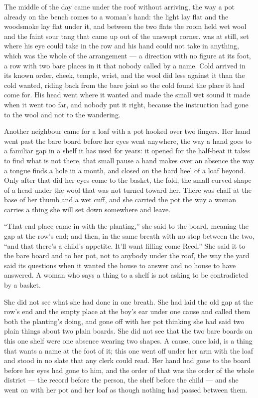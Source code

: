 The middle of the day came under the  roof without arriving, the way a pot already on the bench comes to a woman's hand: the light lay flat and the woodsmoke lay flat under it, and between the two flats the room held wet wool and the faint sour tang that came up out of the unswept  corner.  was at  still, set where his eye could take in the row and his hand could not take in anything, which was the whole of the arrangement --- a direction with no figure at its foot, a row with two bare places in it that nobody called by a name. Cold arrived in its known order, cheek, temple, wrist, and the wool did less against it than the cold wanted, riding back from the bare joint so the cold found the place it had come for. His head went where it wanted and made the small wet sound it made when it went too far, and nobody put it right, because the instruction had gone to the wool and not to the wandering.

Another neighbour came for a loaf with a pot hooked over two fingers. Her hand went past the bare board before her eyes went anywhere, the way a hand goes to a familiar gap in a shelf it has used for years: it opened for the half-beat it takes to find what is not there, that small pause a hand makes over an absence the way a tongue finds a hole in a mouth, and closed on the hard heel of a loaf beyond. Only after that did her eyes come to the basket, the fold, the small curved shape of a head under the wool that was not turned toward her. There was chaff at the base of her thumb and a wet cuff, and she carried the pot the way a woman carries a thing she will set down somewhere and leave.

“That end place came in with the planting,” she said to the board, meaning the gap at the row's end; and then, in the same breath with no stop between the two, “and that there's a child's appetite. It'll want filling come Reed.” She said it to the bare board and to her pot, not to anybody under the roof, the way the yard said its questions when it wanted the house to answer and no house to have answered. A woman who says a thing to a shelf is not asking to be contradicted by a basket.

She did not see what she had done in one breath. She had laid the old gap at the row's end and the empty place at the boy's ear under one cause and called them both the planting's doing, and gone off with her pot thinking she had said two plain things about two plain boards. She did not see that the two bare boards on this one shelf were one absence wearing two shapes. A cause, once laid, is a thing that wants a name at the foot of it; this one went off under her arm with the loaf and stood in no slate that any clerk could read. Her hand had gone to the board before her eyes had gone to him, and the order of that was the order of the whole district --- the record before the person, the shelf before the child --- and she went on with her pot and her loaf as though nothing had passed between them.

